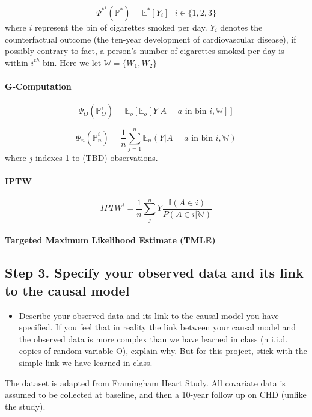 \documentclass[]{article}
\providecommand{\tightlist}{%
  \setlength{\itemsep}{0pt}\setlength{\parskip}{0pt}}
\let\oldparagraph\paragraph
\renewcommand{\paragraph}[1]{\oldparagraph{#1}\mbox{}}
\begin{document}
\[{\Psi^*}^{i}(\mathbb{P}^*)=\mathbb{E}^*[Y_i]\ \ \ i\in \{1,2,3\}\]
where \(i\) represent the bin of cigarettes smoked per day. \(Y_i\)
denotes the counterfactual outcome (the ten-year development of
cardiovascular disease), if possibly contrary to fact, a person's number
of cigarettes smoked per day is within \(i^{th}\) bin. Here we let
\(\mathbb{W} = \{W_1,W_2\}\)

\paragraph{G-Computation}\label{g-computation}

\[\Psi_O(\mathbb{P}^i_O)=\mathbb{E}_o[\mathbb{E}_o[Y|A=a \text{ in bin } i,\mathbb{W}]]\]

\[\Psi_n(\mathbb{P}^i_n) = \frac{1}{n}\sum_{j=1}^n \mathbb{E}_n(Y|A=a \text{ in bin } i,\mathbb{W})\]
where \(j\) indexes 1 to (TBD) observations.

\paragraph{IPTW}\label{iptw}

\[IPTW^i = \frac{1}{n} \sum_{j}^n Y\frac{ \mathbb{I} (A \in i)}{P(A \in i | \mathbb{W})}\]

\paragraph{Targeted Maximum Likelihood Estimate
(TMLE)}\label{targeted-maximum-likelihood-estimate-tmle}

\subsection{Step 3. Specify your observed data and its link to the
causal
model}\label{step-3.-specify-your-observed-data-and-its-link-to-the-causal-model}

\begin{itemize}
\tightlist
\item
  Describe your observed data and its link to the causal model you have
  specified. If you feel that in reality the link between your causal
  model and the observed data is more complex than we have learned in
  class (n i.i.d. copies of random variable O), explain why. But for
  this project, stick with the simple link we have learned in class.
\end{itemize}

The dataset is adapted from Framingham Heart Study. All covariate data
is assumed to be collected at baseline, and then a 10-year follow up on
CHD (unlike the study).
\end{document}

